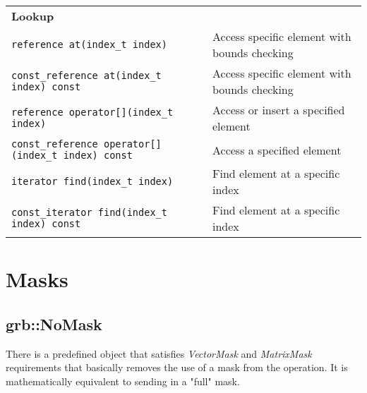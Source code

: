 \begin{tabularx}{\textwidth}{l X}
\textbf{Lookup}\\
\texttt{reference at(index\_t index)} & Access specific element with bounds checking\\
\hline
\texttt{const\_reference at(index\_t index) const} & Access specific element with bounds checking\\
\hline
\texttt{reference operator[](index\_t index)} & Access or insert a specified element\\
\hline
\texttt{const\_reference operator[](index\_t index) const} & Access a specified element\\
\hline
\texttt{iterator find(index\_t index)} & Find element at a specific index\\
\hline
\texttt{const\_iterator find(index\_t index) const} & Find element at a specific index\\
\end{tabularx}



\section{Masks}
\label{Sec:Masks}



\subsection{\sf grb::NoMask}

There is a predefined object that satisfies \textit{VectorMask} and \textit{MatrixMask}
requirements that basically removes the use of a mask from the operation. It
is mathematically equivalent to sending in a "full" mask.
